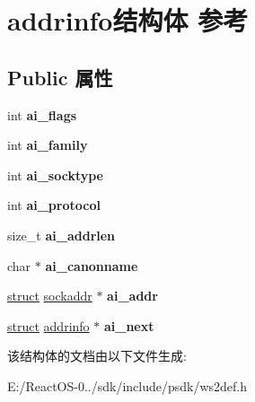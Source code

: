 \hypertarget{structaddrinfo}{}\section{addrinfo结构体 参考}
\label{structaddrinfo}
\subsection*{Public 属性}
\begin{DoxyCompactItemize}
\item 
\mbox{\label{structaddrinfo_ad0b4d4a9e417a5971162cba19597fcc3}} 
int {\bfseries ai\+\_\+flags}
\item 
\mbox{\label{structaddrinfo_af8ba790dc4c689a8b38c947924afe3ee}} 
int {\bfseries ai\+\_\+family}
\item 
\mbox{\label{structaddrinfo_a2b71233551bb3d551ad76ddd27ced896}} 
int {\bfseries ai\+\_\+socktype}
\item 
\mbox{\label{structaddrinfo_a70984f8a57396a9cb6593bc6c030a06c}} 
int {\bfseries ai\+\_\+protocol}
\item 
\mbox{\label{structaddrinfo_a225a0fc5785f7956c4444ef799317994}} 
size\+\_\+t {\bfseries ai\+\_\+addrlen}
\item 
\mbox{\label{structaddrinfo_a2a824b95c7720aacf8c166b43e912ec3}} 
char $\ast$ {\bfseries ai\+\_\+canonname}
\item 
\mbox{\label{structaddrinfo_a2a6343a77144ee3079f6e9e0b66c715c}} 
\hyperlink{interfacestruct}{struct} \hyperlink{structsockaddr}{sockaddr} $\ast$ {\bfseries ai\+\_\+addr}
\item 
\mbox{\label{structaddrinfo_ac8d379469addd7ebbb7cd8f9656268d2}} 
\hyperlink{interfacestruct}{struct} \hyperlink{structaddrinfo}{addrinfo} $\ast$ {\bfseries ai\+\_\+next}
\end{DoxyCompactItemize}


该结构体的文档由以下文件生成\+:\begin{DoxyCompactItemize}
\item 
E\+:/\+React\+O\+S-\/0../sdk/include/psdk/ws2def.\+h\end{DoxyCompactItemize}

